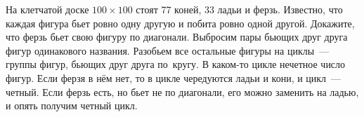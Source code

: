 \problem
На клетчатой доске $100 \times 100$ стоят 77 коней, 33 ладьи и ферзь.
Известно, что каждая фигура бьет ровно одну другую и побита ровно одной другой.
Докажите, что ферзь бьет свою фигуру по диагонали.
\solution
Выбросим пары бьющих друг друга фигур одинакового названия.
Разобьем все остальные фигуры на циклы~--- группы фигур, бьющих друг друга
по~кругу.
В каком-то цикле нечетное число фигур.
Если ферзя в нём нет, то в цикле чередуются ладьи и кони, и цикл~--- четный.
Если ферзь есть, но бьет не по диагонали, его можно заменить на ладью, и опять
получим четный цикл. 
\endproblem
